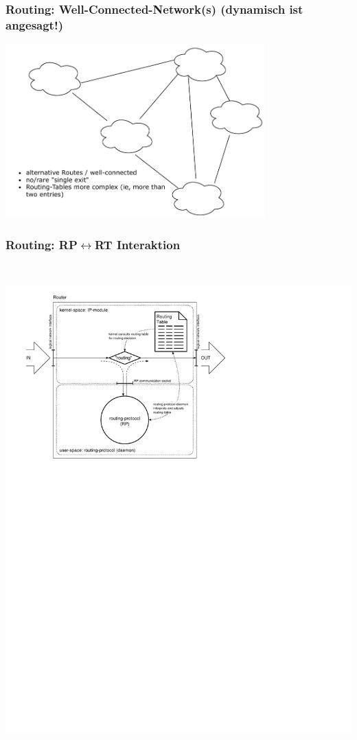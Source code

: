 \documentclass[ignorenonframetext]{beamer}
\begin{document}
\begin{frame}
\frametitle{Routing: Well-Connected-Network(s) {\small (dynamisch ist angesagt!)}}
\begin{center}
\includegraphics[width=10cm]{network-types-wellconnected}
\end{center}
\end{frame}



\begin{frame}
\end{frame}




\begin{frame}
\frametitle{Routing: RP$\leftrightarrow$RT Interaktion}
	\includegraphics[height=19cm]{routing-detail}
\end{frame}
\end{document}
